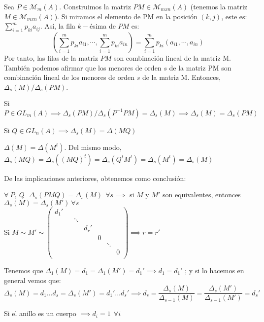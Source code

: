 Sea $P \in \mathcal{M}_m(A)$. Construimos la matriz $PM\in \mathcal{M}_{mxn}(A)$ (tenemos la matriz $M \in \mathcal{M}_{mxn}(A)$). Si miramos el elemento de PM en la posición $(k,j)$, este es: $\sum_{i=1}^m p_{ki}a_{ij}$. Así, la fila $k-$ésima de $PM$ es:
\[
(\sum_{i=1}^m p_{ki}a_{i1}, \cdots , \sum_{i=1}^m p_{ki}a_{in}) = \sum_{i=1}^m p_{ki}(a_{i1},\cdots , a_{in})
\]
Por tanto, las filas de la matriz $PM$ son combinación lineal de la matriz M. También podemos afirmar que los menores de orden $s$ de la matriz PM son combinación lineal de los menores de orden $s$ de la matriz M. Entonces, $\Delta_s(M)/\Delta_s(PM)$.

Si $P\in GL_m(A)\implies \Delta_s(PM) / \Delta_s(P^{-1}PM) = \Delta_s(M) \implies \Delta_s(M) = \Delta_s(PM)$

Si $Q \in GL_n(A) \implies \Delta_s (M) = \Delta(MQ)$

\begin{nota}
	$\Delta(M) = \Delta(M^t)$. Del mismo modo, $\Delta_s(MQ) = \Delta_s((MQ)^t) =  \Delta_s (Q^tM^t) = \Delta_s (M^t) =  \Delta_s(M)$
\end{nota}

De las implicaciones anteriores, obtenemos como conclusión:

$\forall \ P,\ Q \ \ \ \Delta_s(PMQ) = \Delta_s(M) \ \ \forall s \implies$
si $M$ y $M'$ son equivalentes, entonces $\Delta_s(M) = \Delta_s(M') \ \forall s$\\
Si $M \sim M' \sim \begin{pmatrix}
 d_{1}'&  &  & & \\
 &  & \ddots &  &  \\
 & & &d_{r}' &\\
 & & & & 0 \\
 & & & & & \ddots& \\
 & & & &  & & 0 \\
\end{pmatrix}  \implies r = r'$

Tenemos que $\Delta_1(M) = d_1 = \Delta_1 (M') = d_1' \implies d_1 = d_1'$ ; y si lo hacemos en general vemos que:
\[
\Delta_s(M) = d_1...d_s = \Delta_s(M') = d_1'...d_s' \implies d_s =  \frac{\Delta_s(M)}{\Delta_{s-1}(M)} =  \frac{\Delta_s(M')}{\Delta_{s-1}(M')} = d_s'
\]

\begin{nota}
	Si el anillo es un cuerpo $\implies d_i = 1 \ \ \forall i$
\end{nota}

